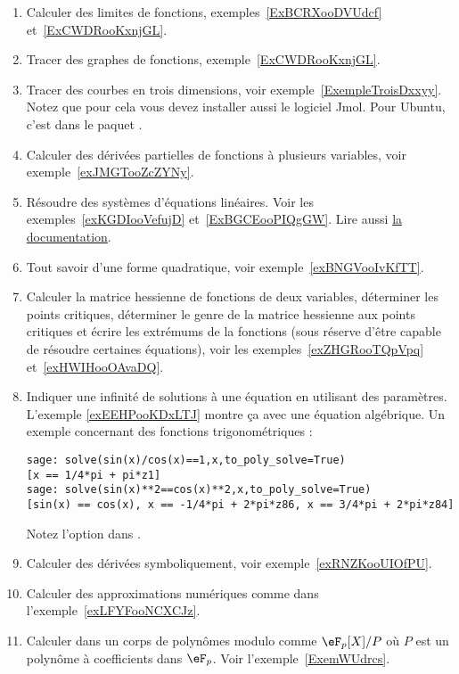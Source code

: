 \begin{enumerate}

	\item
        Calculer des limites de fonctions, exemples~\ref{ExBCRXooDVUdcf} et~\ref{ExCWDRooKxnjGL}.
	\item
        Tracer des graphes de fonctions, exemple~\ref{ExCWDRooKxnjGL}.
	\item
        Tracer des courbes en trois dimensions, voir exemple~\ref{ExempleTroisDxxyy}. Notez que pour cela vous devez installer aussi le logiciel Jmol. Pour Ubuntu, c'est dans le paquet .
	\item
		Calculer des dérivées partielles de fonctions à plusieurs variables, voir exemple~\ref{exJMGTooZcZYNy}.
	\item
        Résoudre des systèmes d'équations linéaires. Voir les exemples~\ref{exKGDIooVefujD} et~\ref{ExBGCEooPIQgGW}. Lire aussi \href{http://www.sagemath.org/doc/constructions/linear_algebra.html#solving-systems-of-linear-equations}{la documentation}.
	\item
        Tout savoir d'une forme quadratique, voir exemple~\ref{exBNGVooIvKfTT}.
	\item
        Calculer la matrice hessienne de fonctions de deux variables, déterminer les points critiques, déterminer le genre de la matrice hessienne aux points critiques et écrire les extrémums de la fonctions (sous réserve d'être capable de résoudre certaines équations), voir les exemples~\ref{exZHGRooTQpVpq} et~\ref{exHWIHooOAvaDQ}.
	\item
        Indiquer une infinité de solutions à une équation en utilisant des paramètres. L'exemple \ref{exEEHPooKDxLTJ} montre ça avec une équation algébrique. Un exemple concernant des fonctions trigonométriques :
        \begin{verbatim}
sage: solve(sin(x)/cos(x)==1,x,to_poly_solve=True)
[x == 1/4*pi + pi*z1]
sage: solve(sin(x)**2==cos(x)**2,x,to_poly_solve=True)
[sin(x) == cos(x), x == -1/4*pi + 2*pi*z86, x == 3/4*pi + 2*pi*z84]
        \end{verbatim}

        Notez l'option  dans .

	\item
        Calculer des dérivées symboliquement, voir exemple~\ref{exRNZKooUIOfPU}.
	\item
        Calculer des approximations numériques comme dans l'exemple~\ref{exLFYFooNCXCJz}.
    \item
        Calculer dans un corps de polynômes modulo comme \( \eF_p[X]/P\) où \( P\) est un polynôme à coefficients dans \( \eF_p\). Voir l'exemple~\ref{ExemWUdrcs}.
\end{enumerate}

